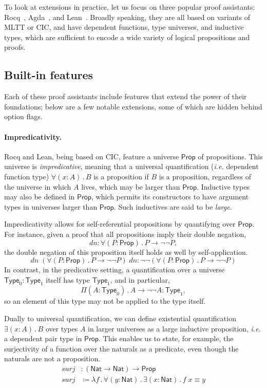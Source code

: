 \documentclass{article}
\makeatletter
\newcommand{\ie}{\textit{i.e.}\@\xspace}
\newcommand{\kw}[1]{\mathsf{#1}}
\makeatother
\begin{document}
To look at extensions in practice,
let us focus on three popular proof assistants:
Rocq~\citep{coq}, Agda~\citep{agda}, and Lean~\citep{lean}.
Broadly speaking, they are all based on variants of MLTT or CIC,
and have dependent functions, type universes, and inductive types,
which are sufficient to encode a wide variety of logical propositions and proofs.

\subsection{Built-in features}

Each of these proof assistants include features that extend the power of their foundations;
below are a few notable extensions,
some of which are hidden behind option flags.

\paragraph{Impredicativity.}
Rocq and Lean, being based on CIC,
feature a universe $\kw{Prop}$ of propositions.
This universe is \emph{impredicative},
meaning that a universal quantification (\ie dependent function type)
$\forall (x : A) \mathpunct{.} B$ is a proposition if $B$ is a proposition,
regardless of the universe in which $A$ lives,
which may be larger than $\kw{Prop}$.
Inductive types may also be defined in $\kw{Prop}$,
which permits its constructors to have argument types
in universes larger than $\kw{Prop}$.
Such inductives are said to be \emph{large}.

Impredicativity allows for self-referential propositions by quantifying over $\kw{Prop}$.
For instance, given a proof that all propositions imply their double negation,
$$\mathit{dn}: \forall (P : \kw{Prop})\mathpunct{.} P \to \neg \neg P,$$
the double negation of this proposition itself holds as well by self-application.
$$\mathit{dn} \; (\forall (P : \kw{Prop})\mathpunct{.} P \to \neg \neg P) \; \mathit{dn} : \neg \neg (\forall (P : \kw{Prop})\mathpunct{.} P \to \neg \neg P)$$
In contrast, in the predicative setting,
a quantification over a universe $\kw{Type}_0 : \kw{Type}_1$ itself has type $\kw{Type}_1$,
and in particular,
$$\Pi (A : \kw{Type}_0)\mathpunct{.} A \to \neg \neg A : \kw{Type}_1,$$
so an element of this type may not be applied to the type itself.

Dually to universal quantification,
we can define existential quantification $\exists (x : A) \mathpunct{.} B$
over types $A$ in larger universes as a large inductive proposition,
\ie a dependent pair type in $\kw{Prop}$.
This enables us to state, for example,
the surjectivity of a function over the naturals as a predicate,
even though the naturals are not a proposition.
%
\begin{align*}
  \mathit{surj} &: (\kw{Nat} \to \kw{Nat}) \to \kw{Prop} \\
  \mathit{surj} &\coloneqq \lambda f \mathpunct{.}
    \forall (y : \kw{Nat}) \mathpunct{.} \exists (x : \kw{Nat}) \mathpunct{.} f \; x \equiv y
\end{align*}
\end{document}
